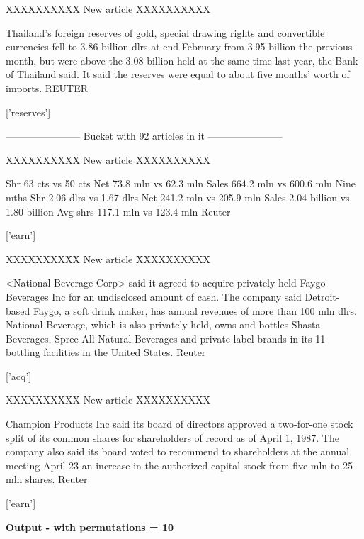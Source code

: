 \documentclass{article}
\begin{document}
\begin{pythonOutput}
['cpi']

XXXXXXXXXX
New article
XXXXXXXXXX

Thailand's foreign reserves of gold,
special drawing rights and convertible currencies fell to 3.86
billion dlrs at end-February from 3.95 billion the previous
month, but were above the 3.08 billion held at the same time
last year, the Bank of Thailand said.
    It said the reserves were equal to about five months' worth
of imports.
 REUTER

['reserves']

-----------------------
Bucket with 92 articles in it
-----------------------


XXXXXXXXXX
New article
XXXXXXXXXX

Shr 63 cts vs 50 cts
    Net 73.8 mln vs 62.3 mln
    Sales 664.2 mln vs 600.6 mln
    Nine mths
    Shr 2.06 dlrs vs 1.67 dlrs
    Net 241.2 mln vs 205.9 mln
    Sales 2.04 billion vs 1.80 billion
    Avg shrs 117.1 mln vs 123.4 mln
 Reuter

['earn']

XXXXXXXXXX
New article
XXXXXXXXXX

<National Beverage Corp>
said it agreed to acquire privately held Faygo Beverages Inc
for an undisclosed amount of cash.
    The company said Detroit-based Faygo, a soft drink maker,
has annual revenues of more than 100 mln dlrs.
    National Beverage, which is also privately held, owns and
bottles Shasta Beverages, Spree All Natural Beverages and
private label brands in its 11 bottling facilities in the
United States.
 Reuter

['acq']

XXXXXXXXXX
New article
XXXXXXXXXX

Champion Products Inc said its
board of directors approved a two-for-one stock split of its
common shares for shareholders of record as of April 1, 1987.
    The company also said its board voted to recommend to
shareholders at the annual meeting April 23 an increase in the
authorized capital stock from five mln to 25 mln shares.
 Reuter

['earn']

\end{pythonOutput}
\textbf{Output - with permutations = 10}\\
\end{document}
